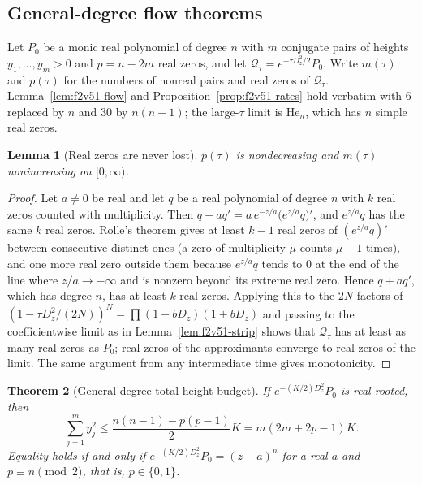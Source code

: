 \documentclass[11pt]{article}
\newtheorem{theorem}{Theorem}[section]
\newtheorem{lemma}[theorem]{Lemma}
\theoremstyle{definition}
\theoremstyle{remark}
\begin{document}
\subsection{General-degree flow theorems}

Let \(P_0\) be a monic real polynomial of degree \(n\) with \(m\)
conjugate pairs of heights \(y_1,\ldots,y_m>0\) and \(p=n-2m\) real
zeros, and let \(\mathcal Q_\tau=e^{-\tau D_z^2/2}P_0\).  Write
\(m(\tau)\) and \(p(\tau)\) for the numbers of nonreal pairs and real
zeros of \(\mathcal Q_\tau\).  Lemma~\ref{lem:f2v51-flow} and
Proposition~\ref{prop:f2v51-rates} hold verbatim with \(6\) replaced by
\(n\) and \(30\) by \(n(n-1)\); the large-\(\tau\) limit is
\(\mathrm{He}_n\), which has \(n\) simple real zeros.

\begin{lemma}[Real zeros are never lost]
\label{lem:f2v52-poulain}
\(p(\tau)\) is nondecreasing and \(m(\tau)\) nonincreasing on
\([0,\infty)\).
\end{lemma}

\begin{proof}
Let \(a\ne0\) be real and let \(q\) be a real polynomial of degree
\(n\) with \(k\) real zeros counted with multiplicity.  Then
\(q+aq'=a\,e^{-z/a}\bigl(e^{z/a}q\bigr)'\), and \(e^{z/a}q\) has the same
\(k\) real zeros.  Rolle's theorem gives at least \(k-1\) real zeros of
\((e^{z/a}q)'\) between consecutive distinct ones (a zero of
multiplicity \(\mu\) counts \(\mu-1\) times), and one more real zero
outside them because \(e^{z/a}q\) tends to \(0\) at the end of the line
where \(z/a\to-\infty\) and is nonzero beyond its extreme real zero.
Hence \(q+aq'\), which has degree \(n\), has at least \(k\) real zeros.
Applying this to the \(2N\) factors of
\((1-\tau D_z^2/(2N))^N=\prod(1-bD_z)(1+bD_z)\) and passing to the
coefficientwise limit as in Lemma~\ref{lem:f2v51-strip} shows that
\(\mathcal Q_\tau\) has at least as many real zeros as \(P_0\); real
zeros of the approximants converge to real zeros of the limit.  The
same argument from any intermediate time gives monotonicity.
\end{proof}

\begin{theorem}[General-degree total-height budget]
\label{thm:f2v52-budget}
If \(e^{-(K/2)D_z^2}P_0\) is real-rooted, then
\begin{equation}
 \boxed{\sum_{j=1}^my_j^2\le\frac{n(n-1)-p(p-1)}{2}K=m(2m+2p-1)K.}
 \label{eq:f2v52-budget}
\end{equation}
Equality holds if and only if \(e^{-(K/2)D_z^2}P_0=(z-a)^n\) for a real
\(a\) and \(p\equiv n\pmod 2\), that is, \(p\in\{0,1\}\).
\end{theorem}
\end{document}
